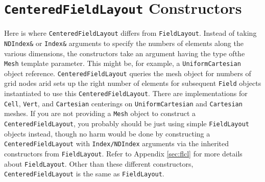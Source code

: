 \section{\texttt{CenteredFieldLayout} Constructors}

Here is where \texttt{CenteredFieldLayout} differs from \texttt{FieldLayout}. Instead of taking \texttt{NDIndex\&} or \texttt{Index\&} arguments to specify the numbers of elements along the 
various dimensions, the constructors take an argument having the type ofthe \texttt{Mesh} template parameter. This might be, for example, a \texttt{UniformCartesian} object reference. 
\texttt{CenteredFieldLayout} queries the mesh object for numbers of grid nodes arid sets up the right number of elements for subsequent \texttt{Field} objects instantiated to use this \texttt{CenteredFieldLayout}.
There are implementations for \texttt{Cell}, \texttt{Vert}, and \texttt{Cartesian} centerings on \texttt{UniformCartesian} and \texttt{Cartesian} meshes. 
If you are not providing a \texttt{Mesh} object to construct a \texttt{CenteredFieldLayout}, you probably should be just using simple \texttt{FieldLayout} objects instead, though no harm would be done by constructing a \texttt{CenteredFieldLayout} with \texttt{Index/NDIndex} arguments via the inherited constructors from \texttt{FieldLayout}. Refer to Appendix \ref{sec:flcl} for more details about \texttt{FieldLayout}. Other than these different constructors, \texttt{CenteredFieldLayout} is the same as \texttt{FieldLayout}. 



















